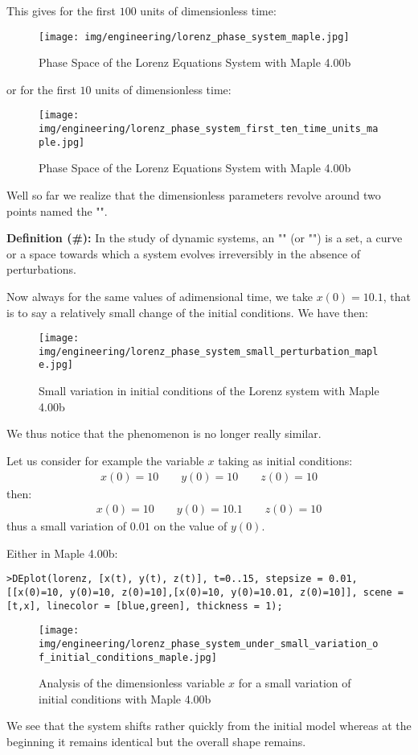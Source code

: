 	This gives for the first $100$ units of dimensionless time:
	\begin{figure}[H]
		\centering
		\texttt{[image: img/engineering/lorenz\_phase\_system\_maple.jpg]}	
		\caption{Phase Space of the Lorenz Equations System with Maple 4.00b}
	\end{figure}
	or for the first $10$ units of dimensionless time:
	\begin{figure}[H]
		\centering
		\texttt{[image: img/engineering/lorenz\_phase\_system\_first\_ten\_time\_units\_maple.jpg]}	
		\caption[]{Phase Space of the Lorenz Equations System with Maple 4.00b}
	\end{figure}
	Well so far we realize that the dimensionless parameters revolve around two points named the "".

	\textbf{Definition (\#\mydef):} In the study of dynamic systems, an "" (or "") is a set, a curve or a space towards which a system evolves irreversibly in the absence of perturbations.

	Now always for the same values of adimensional time, we take $x(0)=10.1$, that is to say a relatively small change of the initial conditions. We have then:
	\begin{figure}[H]
		\centering
		\texttt{[image: img/engineering/lorenz\_phase\_system\_small\_perturbation\_maple.jpg]}	
		\caption[]{Small variation in initial conditions of the Lorenz system with Maple 4.00b}
	\end{figure}
	We thus notice that the phenomenon is no longer really similar.

	Let us consider for example the variable $x$ taking as initial conditions:
	\begin{gather*}
		x(0)=10 \qquad y(0)=10 \qquad z(0)=10
	\end{gather*}
	then:
	\begin{gather*}
		x(0)=10 \qquad y(0)=10.1 \qquad z(0)=10
	\end{gather*}
	thus a small variation of $0.01$ on the value of $y(0)$.

	Either in Maple 4.00b:
	
	\texttt{>DEplot({lorenz}, [x(t), y(t), z(t)], t=0..15, stepsize = 0.01, [[x(0)=10, y(0)=10, z(0)=10],[x(0)=10, y(0)=10.01, z(0)=10]], scene = [t,x], linecolor = [blue,green], thickness = 1);}
	\begin{figure}[H]
		\centering
		\texttt{[image: img/engineering/lorenz\_phase\_system\_under\_small\_variation\_of\_initial\_conditions\_maple.jpg]}	
		\caption[]{Analysis of the dimensionless variable $x$ for a small variation of initial conditions with Maple 4.00b}
	\end{figure}
	We see that the system shifts rather quickly from the initial model whereas at the beginning it remains identical but the overall shape remains.

